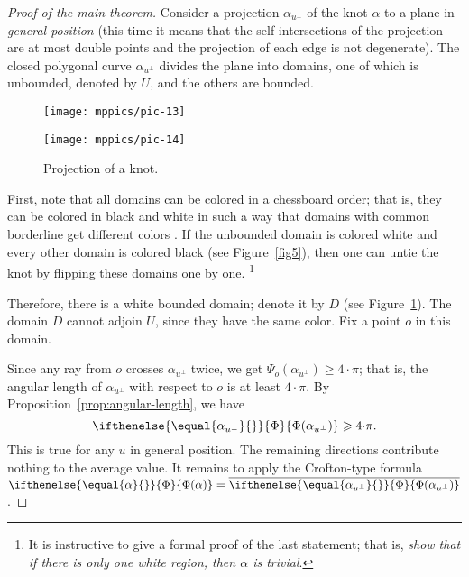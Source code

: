 \documentclass{article}
\newcommand*{\arXiv}[2]{#1} %
\theoremstyle{theorem}
\newtheorem{Crofton-type formula}[theorem]{Crofton-type formula}
\newtheorem{Douglas--Rado theorem}[theorem]{\arXiv{Douglas--Rado theorem}{Theorem}}
\newtheorem{Extended monotonicity theorem}[theorem]{\arXiv{Extended monotonicity theorem}{Theorem}}
\theoremstyle{definition}
\newcommand*{\tc}[1]{\ifthenelse{\equal{#1}{}}{\Phi}{\Phi({#1})}}%
\def\ge{\geqslant}
\begin{document}
\begin{proof}[Proof of \arXiv{the main theorem}{Main Theorem}]
Consider a projection $\alpha_{u^\perp}$ of the knot $\alpha$ to a plane in \emph{general position}
(\arXiv{this time it means}{meaning} that the self-intersections of the projection are at most double points and the projection of each edge is not degenerate).
The closed polygonal curve $\alpha_{u^\perp}$ divides the plane into domains, one of which is unbounded, denoted by $U$, and the others are bounded.

\begin{figure}[!ht]
\begin{minipage}{.48\textwidth}
\centering
\arXiv{\texttt{[image: mppics/pic-13]}}{\texttt{[image: pic-13]}}
\end{minipage}\hfill
\begin{minipage}{.48\textwidth}
\centering
\arXiv{\texttt{[image: mppics/pic-14]}}{\texttt{[image: pic-14]}}
\end{minipage}

\medskip

\begin{minipage}{.48\textwidth}
\centering
\caption{Projection of an unknot.}
\label{fig5}
\end{minipage}\hfill
\begin{minipage}{.48\textwidth}
\centering
\caption{Projection of a knot.}
\label{fig6}
\end{minipage}
\vskip-0mm
\end{figure}

First, note that all domains can be colored in a chessboard order;
that is, they can be colored in black and white in such a way that domains with common borderline get different colors \cite[Exercise 2.27]{adams}.
If the unbounded domain is colored white and every other domain is colored black (see Figure~\ref{fig5}), then one can untie the knot by flipping these domains one by one.%
\footnote{It is instructive to give a formal proof of the last statement; that is, \textit{show that if there is only one white region, then $\alpha$ is trivial}.}

Therefore, there is a white bounded domain; denote it by $D$ (see Figure~\ref{fig6}).
The domain $D$ cannot adjoin 
$U$, since they have the same color.
Fix a point $o$ in this domain.

Since any ray from $o$ crosses $\alpha_{u^\perp}$ twice, we get $\Psi_o(\alpha_{u^\perp})\ge 4\arXiv{{\cdot}}{}\pi$;
that is, the angular length of $\alpha_{u^\perp}$ with respect to $o$ is at least $4\arXiv{{\cdot}}{}\pi$. 
By Proposition~\ref{prop:angular-length}, we have 
\[\tc{\alpha_{u^\perp}}\ge4\arXiv{{\cdot}}{}\pi.\]
This is true for any $u$ in general position.
The remaining directions contribute nothing to the average value.
It remains to apply the Crofton-type formula $\tc{\alpha}=\overline{\tc{\alpha_{u^\perp}}}$.
\end{proof}
\end{document}
